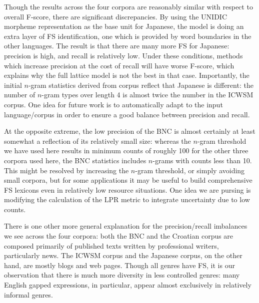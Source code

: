 \documentclass[11pt,letterpaper]{article}
\begin{document}
Though the results across the four corpora are reasonably similar with respect to overall F-score, there are significant discrepancies. By using the UNIDIC morpheme representation as the base unit for Japanese, the model is doing an extra layer of FS identification, one which is provided by word boundaries in the other languages. The result is that there are many more FS for Japanese: precision is high, and recall is relatively low. Under these conditions, methods which increase precision at the cost of recall will have worse F-score, which explains why the full lattice model is not the best in that case.  Importantly, the initial $n$-gram statistics derived from corpus reflect that Japanese is different: the number of $n$-gram types over length 4 is almost twice the number in the ICWSM corpus. One idea for future work is to automatically adapt to the input language/corpus in order to ensure a good balance between precision and recall.

At the opposite extreme, the low precision of the BNC is almost certainly at least somewhat a reflection of its relatively small size: whereas the $n$-gram threshold we have used here results in minimum counts of roughly 100 for the other three corpora used here, the BNC statistics includes $n$-grams with counts less than 10. This might be resolved by increasing the $n$-gram threshold, or simply avoiding small corpora, but for some applications it may be useful to build comprehensive FS lexicons even in relatively low resource situations. One idea we are pursing is modifying the calculation of the LPR metric to integrate uncertainty due to low counts.

There is one other more general explanation for the precision/recall imbalances we see across the four corpora: both the BNC and the Croatian corpus are composed primarily of published texts written by professional writers, particularly news. The ICWSM corpus and the Japanese corpus, on the other hand, are mostly blogs and web pages. Though all genres have FS, it is our observation that there is much more diversity in less controlled genres: many English gapped expressions, in particular, appear almost exclusively in relatively informal genres. 

\end{document}
